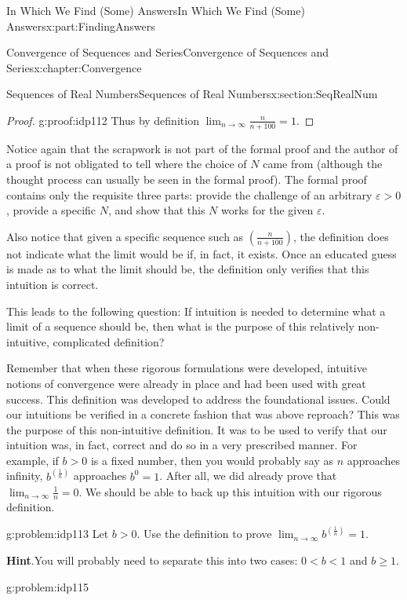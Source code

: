 \documentclass[oneside,10pt,]{book}
\newcommand{\blocktitlefont}{\relax}
\numberwithin{equation}{section}
\def\limit#1#2#3{{\displaystyle\lim_{#1\rightarrow #2}#3}}
\newcommand{\eps}{\varepsilon}
\newcommand{\lt}{<}
\begin{document}
\begin{partptx}{In Which We Find (Some) Answers}{}{In Which We Find (Some) Answers}{}{}{x:part:FindingAnswers}
\begin{chapterptx}{Convergence of Sequences and Series}{}{Convergence of Sequences and Series}{}{}{x:chapter:Convergence}
\begin{sectionptx}{Sequences of Real Numbers}{}{Sequences of Real Numbers}{}{}{x:section:SeqRealNum}
\begin{proof}{}{g:proof:idp112}
Thus by definition \(\lim_{n\rightarrow\infty}\frac{n}{n+100} =1\).%
\end{proof}
Notice again that the scrapwork is not part of the formal proof and the author of a proof is not obligated to tell where the choice of \(N\) came from (although the thought process can usually be seen in the formal proof). The formal proof contains only the requisite three parts: provide the challenge of an arbitrary \(\eps>0\), provide a specific \(N\), and show that this \(N\) works for the given \(\eps\).%
\par
Also notice that given a specific sequence such as \(\left(\frac{n}{n+100}\right)\), the definition does not indicate what the limit would be if, in fact, it exists. Once an educated guess is made as to what the limit should be, the definition only verifies that this intuition is correct.%
\par
This leads to the following question: If intuition is needed to determine what a limit of a sequence should be, then what is the purpose of this relatively non-intuitive, complicated definition?%
\par
Remember that when these rigorous formulations were developed, intuitive notions of convergence were already in place and had been used with great success. This definition was developed to address the foundational issues. Could our intuitions be verified in a concrete fashion that was above reproach? This was the purpose of this non-intuitive definition. It was to be used to verify that our intuition was, in fact, correct and do so in a very prescribed manner. For example, if \(b>0\) is a fixed number, then you would probably say as \(n\) approaches infinity, \(b^{\left(\frac{1}{n}\right)}\) approaches \(b^0=1\). After all, we did already prove that \(\lim_{n\rightarrow\infty}\frac{1}{n}=0\). We should be able to back up this intuition with our rigorous definition.%
\begin{problem}{}{g:problem:idp113}%
 Let \(b>0\). Use the definition to prove \(\limit{n}{\infty}{b^{\left(\frac{1}{n}\right)}}=1\).%
\par\smallskip%
\noindent\textbf{\blocktitlefont Hint}.\hypertarget{g:hint:idp114}{}\quad{}You will probably need to separate this into two cases: \(0\lt b\lt 1\) and \(b\geq 1\).%
\end{problem}
\begin{problem}{}{g:problem:idp115}%
\begin{enumerate}[font=\bfseries,label=(\alph*),ref=\alph*]

\end{enumerate}
\end{problem}
\end{sectionptx}
\end{chapterptx}
\end{partptx}
\end{document}
